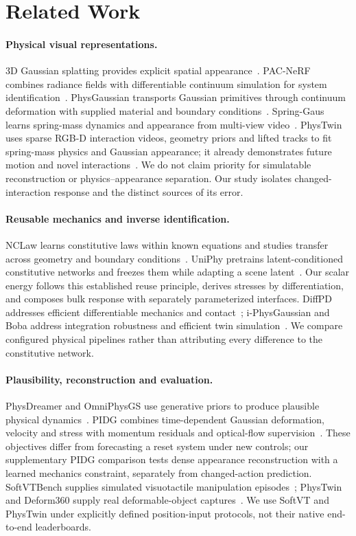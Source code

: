 \documentclass[10pt,twocolumn,letterpaper]{article}
\begin{document}
\section{Related Work}
\paragraph{Physical visual representations.}
3D Gaussian splatting provides explicit spatial appearance~\cite{kerbl2023gaussians}. PAC-NeRF combines radiance fields with differentiable continuum simulation for system identification~\cite{li2023pacnerf}. PhysGaussian transports Gaussian primitives through continuum deformation with supplied material and boundary conditions~\cite{xie2024physgaussian}. Spring-Gaus learns spring-mass dynamics and appearance from multi-view video~\cite{zhong2024springgaus}. PhysTwin uses sparse RGB-D interaction videos, geometry priors and lifted tracks to fit spring-mass physics and Gaussian appearance; it already demonstrates future motion and novel interactions~\cite{jiang2025phystwin}. We do not claim priority for simulatable reconstruction or physics--appearance separation. Our study isolates changed-interaction response and the distinct sources of its error.

\paragraph{Reusable mechanics and inverse identification.}
NCLaw learns constitutive laws within known equations and studies transfer across geometry and boundary conditions~\cite{ma2023nclaw}. UniPhy pretrains latent-conditioned constitutive networks and freezes them while adapting a scene latent~\cite{mittal2025uniphy}. Our scalar energy follows this established reuse principle, derives stresses by differentiation, and composes bulk response with separately parameterized interfaces. DiffPD addresses efficient differentiable mechanics and contact~\cite{du2022diffpd}; i-PhysGaussian and Boba address integration robustness and efficient twin simulation~\cite{cao2026iphysgaussian,pang2026boba}. We compare configured physical pipelines rather than attributing every difference to the constitutive network.

\paragraph{Plausibility, reconstruction and evaluation.}
PhysDreamer and OmniPhysGS use generative priors to produce plausible physical dynamics~\cite{zhang2024physdreamer,lin2025omniphysgs}. PIDG combines time-dependent Gaussian deformation, velocity and stress with momentum residuals and optical-flow supervision~\cite{hong2026pidg}. These objectives differ from forecasting a reset system under new controls; our supplementary PIDG comparison tests dense appearance reconstruction with a learned mechanics constraint, separately from changed-action prediction. SoftVTBench supplies simulated visuotactile manipulation episodes~\cite{jing2026softvt}; PhysTwin and Deform360 supply real deformable-object captures~\cite{jiang2025phystwin,li2026deform360}. We use SoftVT and PhysTwin under explicitly defined position-input protocols, not their native end-to-end leaderboards.
\end{document}
